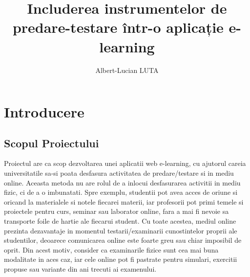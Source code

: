 \documentclass[12pt, a4paper, oneside, romanian]{teza-upb}
\begin{document}
\author{Albert-Lucian LUTA}

\title{Includerea instrumentelor de predare-testare într-o aplicație e-learning}



\beforepreface
\listoffigures
\listoftables
{}
\afterpreface 

\chapter*{Introducere}

\section{Scopul Proiectului}

Proiectul are ca scop dezvoltarea unei aplicatii web e-learning, cu ajutorul careia universitatile sa-si poata desfasura activitatea de predare/testare si in mediu online. Aceasta metoda nu are rolul de a inlocui desfasurarea activitii in mediu fizic, ci de a o imbunatati. Spre exemplu, studentii pot avea acces de oriune si oricand la materialele si notele fiecarei materii, iar profesorii pot primi temele si proiectele pentru curs, seminar sau laborator online, fara a  mai fi nevoie sa transporte foile de hartie ale fiecarui student. Cu toate acestea, mediul online prezinta dezavantaje in momentul testarii/examinarii cunostintelor proprii ale studentilor, deoarece comunicarea online este foarte greu sau chiar imposibil de oprit. Din acest motiv, consider ca examinarile fizice sunt cea mai buna modalitate in aces caz, iar cele online pot fi pastrate pentru simulari, exercitii propuse sau variante din ani trecuti ai examenului.
\end{document}
